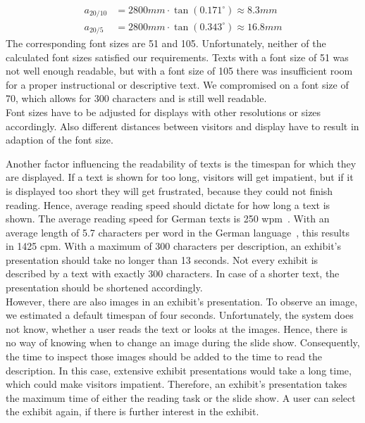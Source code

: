 \begin{align*}
	a_{20/10} &= 2800mm \cdot \tan{(0.171^\circ)} \approx 8.3mm
	\\
	a_{20/5} &= 2800mm \cdot \tan{(0.343^\circ)} \approx 16.8mm
\end{align*}
The corresponding font sizes are 51 and 105. Unfortunately, neither of the calculated font sizes satisfied our requirements. Texts with a font size of 51 was not well enough readable, but with a font size of 105 there was insufficient room for a proper instructional or descriptive text. We compromised on a font size of 70, which allows for 300 characters and is still well readable.
\\
Font sizes have to be adjusted for displays with other resolutions or sizes accordingly. Also different distances between visitors and display have to result in adaption of the font size.

Another factor influencing the readability of texts is the timespan for which they are displayed. If a text is shown for too long, visitors will get impatient, but if it is displayed too short they will get frustrated, because they could not finish reading. Hence, average reading speed should dictate for how long a text is shown. The average reading speed for German texts is 250 \ac{wpm}~\cite{Lesegeschwindigkeit}. With an average length of 5.7 characters per word in the German language~\cite{Wortlaenge}, this results in 1425 \ac{cpm}. With a maximum of 300 characters per description, an exhibit's presentation should take no longer than 13 seconds. Not every exhibit is described by a text with exactly 300 characters. In case of a shorter text, the presentation should be shortened accordingly. 
\\
However, there are also images in an exhibit's presentation. To observe an image, we estimated a default timespan of four seconds. Unfortunately, the system does not know, whether a user reads the text or looks at the images. Hence, there is no way of knowing when to change an image during the slide show. Consequently, the time to inspect those images should be added to the time to read the description. In this case, extensive exhibit presentations would take a long time, which could make visitors impatient. Therefore, an exhibit's presentation takes the maximum time of either the reading task or the slide show. A user can select the exhibit again, if there is further interest in the exhibit.


